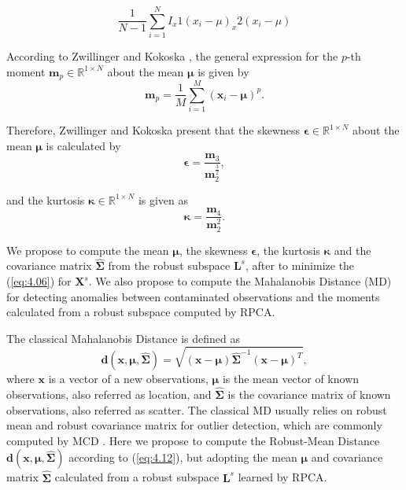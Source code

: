 \documentclass[review]{elsarticle}
\begin{document}
\begin{equation}\label{eq:4.08.1}
	\frac{1}{N-1} \sum_{i = 1}^{N} I_x1 (x_i - \mu ) _x2 (x_i - \mu) 
\end{equation}



According to Zwillinger and Kokoska \cite{zwillinger1999crc}, the general expression for the $p$-th moment $\pmb{m}_p \in \mathbb{R}^{1 \times N}$ about the mean $\pmb{\mu}$ is given by
\begin{equation}\label{eq:4.09}
	\pmb{m}_p = \displaystyle\frac{1}{M}\displaystyle\sum_{i = 1}^{M}(\pmb{x}_i - \pmb{\mu})^p.
\end{equation}

Therefore, Zwillinger and Kokoska \cite{zwillinger1999crc} present that the skewness $\pmb{\epsilon} \in \mathbb{R}^{1 \times N}$ about the mean $\pmb{\mu}$ is calculated by
\begin{equation}\label{eq:4.10}
	\pmb{\epsilon} = \frac{\pmb{m}_3}{\pmb{m}_2^{\frac{3}{2}}},
\end{equation}

and the kurtosis $\pmb{\kappa} \in \mathbb{R}^{1 \times N}$ is given as
\begin{equation}\label{eq:4.11}
	\pmb{\kappa} = \frac{\pmb{m}_4}{\pmb{m}_2^2}.
\end{equation}

We propose to compute the mean $\pmb{\mu}$, the skewness $\pmb{\epsilon}$, the kurtosis $\pmb{\kappa}$ and the covariance matrix $\hat{\pmb{\Sigma}}$ from the robust subspace $\pmb{L}^s$, after to minimize the (\ref{eq:4.06}) for $\pmb{X}^s$. We also propose to compute the Mahalanobis Distance (MD) for detecting anomalies between contaminated observations and the moments calculated from a robust subspace computed by RPCA. 

The classical Mahalanobis Distance is defined as		
\begin{equation}\label{eq:4.12}
	\pmb{d}(\pmb{x}, \pmb{\mu}, \hat{\pmb{\Sigma}}) = \sqrt{(\pmb{x} - \pmb{\mu}) \hat{\pmb{\Sigma}}^{-1}(\pmb{x} - \pmb{\mu})^T},
\end{equation}
where $\pmb{x}$ is a vector of a new observations, $\pmb{\mu}$ is the mean vector of known observations, also referred as location, and $\hat{\pmb{\Sigma}}$ is the covariance matrix of known observations, also referred as scatter. The classical MD usually relies on robust mean and robust covariance matrix for outlier detection, which are commonly computed by MCD \cite{rousseeuw1984mcd, rousseeuw1999fastmcd}. Here we propose to compute the Robust-Mean Distance $\pmb{d}(\pmb{x}, \pmb{\mu}, \hat{\pmb{\Sigma}})$ according to (\ref{eq:4.12}), but adopting the mean $\pmb{\mu}$ and covariance matrix $\hat{\pmb{\Sigma}}$ calculated from a robust subspace $\pmb{L}^s$ learned by RPCA.
\end{document}
